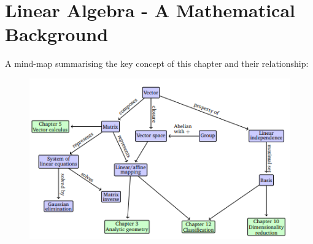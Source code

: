 \section{Linear Algebra - A Mathematical Background}
A mind-map summarising the key concept of this chapter and their relationship:
\begin{figure}[htbp]
    \centering
    \includegraphics[width= 12cm]{Mathematical Background/mind-map.png}
\end{figure}

